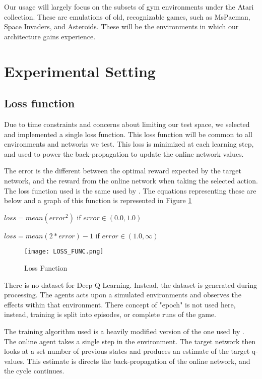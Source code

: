 \documentclass{article}
\begin{document}
Our usage will largely focus on the subsets of gym environments under the Atari collection. These are emulations of old, recognizable games, such as MsPacman, Space Invaders, and Asteroids. These will be the environments in which our architecture gains experience.


\section{Experimental Setting}

\subsection{Loss function}

Due to time constraints and concerns about limiting our test space, we selected and implemented a single loss function. This loss function will be common to all environments and networks we test. This loss is minimized at each learning step, and used to power the back-propagation to update the online network values.

The error is the different between the optimal reward expected by the target network, and the reward from the online network when taking the selected action. The loss function used is the same used by \cite{ageron_repo}. The equations representing these are below and a graph of this function is represented in Figure \ref{fig:loss_func}

$loss = mean(error^2)$ if $error\in(0.0,1.0)$

$loss = mean(2*error) - 1$ if $error\in(1.0,\infty)$

\begin{figure}[h]
  \centering
  \texttt{[image: LOSS\_FUNC.png]}
  \caption{\label{fig:loss_func}Loss Function}
\end{figure}

There is no dataset for Deep Q Learning. Instead, the dataset is generated during processing. The agents acts upon a simulated environments and observes the effects within that environment. There concept of "epoch" is not used here, instead, training is split into episodes, or complete runs of the game.

The training algorithm used is a heavily modified version of the one used by \cite{ageron_repo}. The online agent takes a single step in the environment. The target network then looks at a set number of previous states and produces an estimate of the target q-values. This estimate is directs the back-propagation of the online network, and the cycle continues. 
\end{document}
